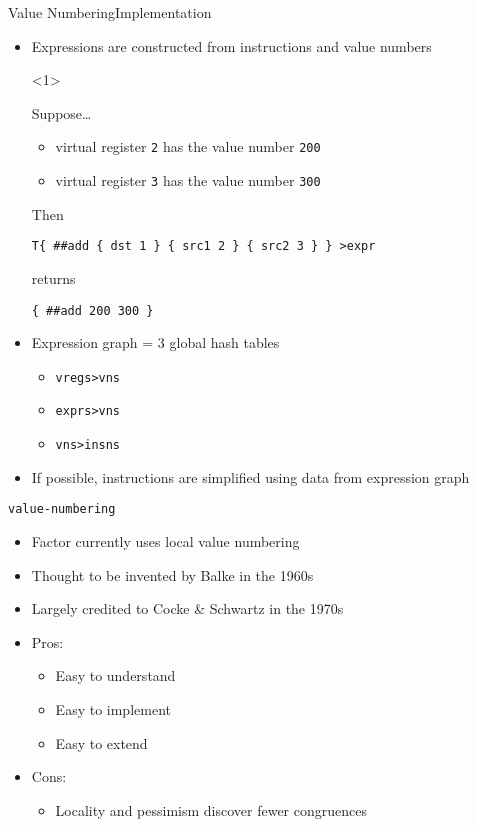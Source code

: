 \documentclass{beamer}
\begin{document}
\begin{frame}[fragile,t]{Value Numbering}{Implementation}
  \begin{itemize}
    \item \alert{Expressions} are constructed from instructions and value numbers
    \begin{onlyenv}<1>
    \begin{example}
      Suppose\ldots
      \begin{itemize}
        \item virtual register \texttt{2} has the value number \texttt{200}
        \item virtual register \texttt{3} has the value number \texttt{300}
      \end{itemize}
      Then
      \begin{Verbatim}
T{ ##add { dst 1 } { src1 2 } { src2 3 } } >expr
      \end{Verbatim}
      returns
      \begin{Verbatim}
{ ##add 200 300 }
      \end{Verbatim}
    \end{example}
    \end{onlyenv}
    \pause
    \item \alert{Expression graph} = 3 global hash tables
    \begin{itemize}
      \item \texttt{vregs>vns}
      \item \texttt{exprs>vns}
      \item \texttt{vns>insns}
    \end{itemize}
    \item If possible, instructions are simplified using data from expression
    graph
  \end{itemize}
\end{frame}

\begin{frame}{\texttt{value-numbering}}
  \begin{itemize}
    \item Factor currently uses \alert{local} value numbering
    \item Thought to be invented by Balke in the 1960s
    \item Largely credited to Cocke \& Schwartz in the 1970s
    \item \textcolor{green!80!black}{Pros:}
    \begin{itemize}
      \item Easy to understand
      \item Easy to implement
      \item Easy to extend
    \end{itemize}
    \item \alert{Cons:}
    \begin{itemize}
      \item Locality and \alert{pessimism} discover fewer congruences
    \end{itemize}
  \end{itemize}
\end{frame}
\end{document}
